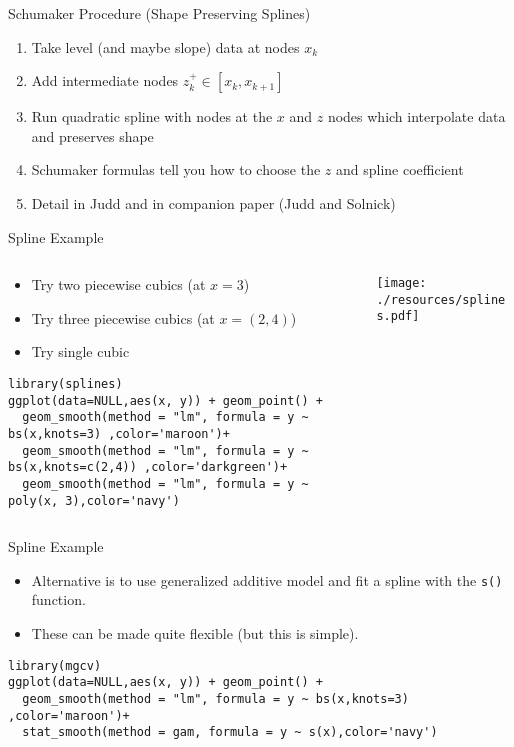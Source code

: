\begin{frame}{Schumaker Procedure (Shape Preserving Splines)}
\begin{enumerate}
\item Take level (and maybe slope) data at nodes $x_k$
\item Add intermediate nodes $z_k^{+} \in [x_k,x_{k+1}]$
\item Run quadratic spline with nodes at the $x$ and $z$ nodes which interpolate data and preserves shape
\item Schumaker formulas tell you how to choose the $z$ and spline coefficient
\item Detail in Judd and in companion paper (Judd and Solnick)
\end{enumerate}
\end{frame}

\begin{frame}[fragile]{Spline Example}
\begin{columns}
\begin{column}{0.5\textwidth}
\begin{itemize}
\item Try two piecewise cubics (at $x=3$)
\item Try three piecewise cubics (at $x=(2,4)$)
\item Try single cubic
\end{itemize}

 \tiny
 \vspace{2.4cm}
\begin{verbatim}
library(splines)
ggplot(data=NULL,aes(x, y)) + geom_point() + 
  geom_smooth(method = "lm", formula = y ~ bs(x,knots=3) ,color='maroon')+
  geom_smooth(method = "lm", formula = y ~ bs(x,knots=c(2,4)) ,color='darkgreen')+
  geom_smooth(method = "lm", formula = y ~ poly(x, 3),color='navy')
\end{verbatim}
\end{column}
\begin{column}{0.5\textwidth}  %
    \begin{center}
    \texttt{[image: ./resources/splines.pdf]}
     \end{center}
\end{column}
\end{columns}
\end{frame}



\begin{frame}[fragile]{Spline Example}
\begin{itemize}
\item Alternative is to use \alert{generalized additive model} and fit a spline with the \texttt{s()} function.
\item These can be made quite flexible (but this is simple).
\end{itemize}
 \tiny
\begin{verbatim}
library(mgcv)
ggplot(data=NULL,aes(x, y)) + geom_point() + 
  geom_smooth(method = "lm", formula = y ~ bs(x,knots=3) ,color='maroon')+
  stat_smooth(method = gam, formula = y ~ s(x),color='navy')
\end{verbatim}
\end{frame}



